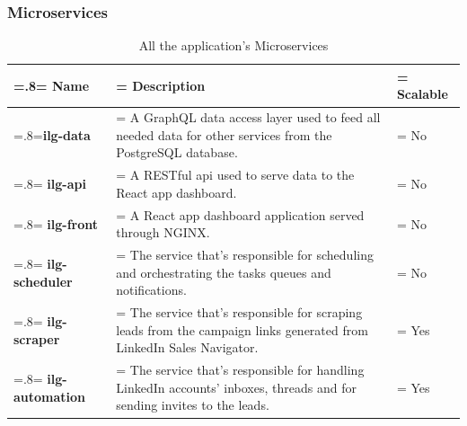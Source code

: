 \subsubsection{Microservices}
\begin{table}[H]
	\renewcommand{\arraystretch}{1.5}%
	\caption{All the application's Microservices}
	\centering
	\medskip
	\begin{tabularx}{1\textwidth} {
			| >{\hsize=.8\hsize\linewidth=\hsize\centering\arraybackslash}X
			| >{\hsize=1.75\hsize\linewidth=\hsize\justifying\arraybackslash}X
			| >{\hsize=0.45\hsize\linewidth=\hsize\centering\arraybackslash}X |}
		\hline
		\rowcolor{primary} \textbf{Name} & \noindent \textbf{Description}                                                                                                  & \textbf{Scalable} \\
		\hline
		\textbf {ilg-data}               & \noindent A GraphQL data access layer used to feed all needed data for other services from the PostgreSQL database.             & No                \\
		\hline
		\textbf {ilg-api}                & \noindent A RESTful api used to serve data to the React app dashboard.                                                          & No                \\
		\hline
		\textbf {ilg-front}              & \noindent A React app dashboard application served through NGINX.                                                               & No                \\
		\hline
		\textbf {ilg-scheduler}          & \noindent The service that's responsible for scheduling and orchestrating the tasks queues and notifications.                   & No                \\
		\hline
		\textbf {ilg-scraper}            & \noindent The service that's responsible for scraping leads from the campaign links generated from LinkedIn Sales Navigator.    & Yes               \\
		\hline
		\textbf {ilg-automation}         & \noindent The service that's responsible for handling LinkedIn accounts' inboxes, threads and for sending invites to the leads. & Yes               \\
		\hline
	\end{tabularx}
\end{table}

